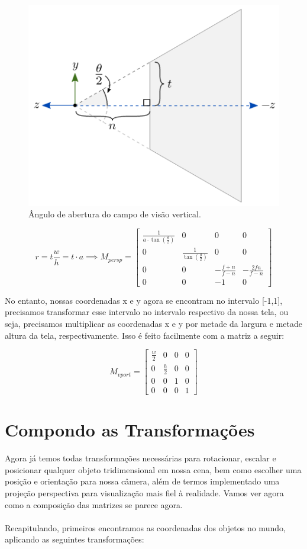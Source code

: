 \documentclass[12pt]{article}
\begin{document}
\begin{figure}[H]
    \centering
    \includegraphics[width=0.6\linewidth]{imgs/Screenshot 2023-11-20 at 18-58-22 8.2 Projeção perspectiva MCTA008-17 Computação Gráfica.png}
    \caption{Ângulo de abertura do campo de visão vertical. }
\end{figure}

\[
r=t\frac{w}{h} = t \cdot a    
\implies
M_{persp} =
\begin{bmatrix}
    \frac{1}{a \cdot \tan(\frac{\theta}{2})} & 0 & 0 & 0 \\    
    0 & \frac{1}{\tan(\frac{\theta}{2})} & 0 & 0 \\    
    0 & 0 & -\frac{f+n}{f-n} & -\frac{2fn}{f-n} \\
    0 & 0 & -1 & 0 
\end{bmatrix}    
\]

\noindent
No entanto, nossas coordenadas x e y agora se encontram no intervalo [-1,1], precisamos transformar esse intervalo no intervalo respectivo da nossa tela, ou seja, precisamos multiplicar as coordenadas x e y por metade da largura e metade altura da tela, respectivamente. Isso é feito facilmente com a matriz a seguir:

\[
M_{vport} =
\begin{bmatrix}
    \frac{w}{2} & 0 & 0 & 0 \\
    0 & \frac{h}{2} & 0 & 0 \\
    0 & 0 & 1 & 0 \\
    0 & 0 & 0 & 1
\end{bmatrix}    
\]

\section{Compondo as Transformações}

Agora já temos todas transformações necessárias para rotacionar, escalar e posicionar qualquer objeto tridimensional em nossa cena, bem como escolher uma posição e orientação para nossa câmera, além de termos implementado uma projeção perspectiva para visualização mais fiel à realidade. Vamos ver agora como a composição das matrizes se parece agora.
\\~\\
Recapitulando, primeiros encontramos as coordenadas dos objetos no mundo, aplicando as seguintes transformações:
\end{document}
